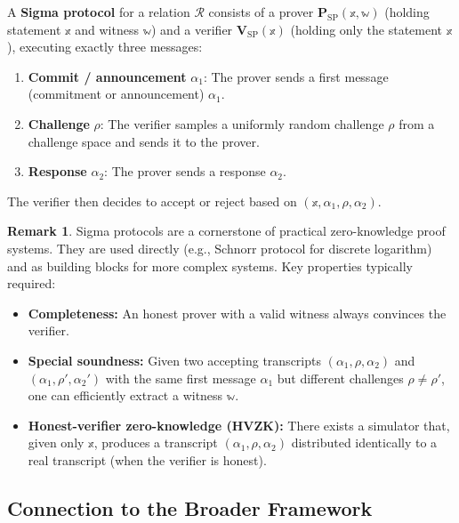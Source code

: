 \documentclass[11pt]{article}
\theoremstyle{plain}
\theoremstyle{definition}
\newtheorem{remark}[theorem]{Remark}
\begin{document}
\begin{definitionbox}
  A \textbf{Sigma protocol} for a relation $\mathcal{R}$ consists of a prover
  $\mathbf{P}_{\mathrm{SP}}(\mathbb{x}, \mathbb{w})$ (holding statement $\mathbb{x}$ and
  witness $\mathbb{w}$) and a verifier $\mathbf{V}_{\mathrm{SP}}(\mathbb{x})$
  (holding only the statement $\mathbb{x}$), executing exactly three messages:
  \begin{enumerate}
    \item \textbf{Commit / announcement} $\alpha_1$: The prover sends a first message
      (commitment or announcement) $\alpha_1$.
    \item \textbf{Challenge} $\rho$: The verifier samples a uniformly random challenge
      $\rho$ from a challenge space and sends it to the prover.
    \item \textbf{Response} $\alpha_2$: The prover sends a response $\alpha_2$.
  \end{enumerate}
  The verifier then decides to accept or reject based on $(\mathbb{x}, \alpha_1, \rho,
  \alpha_2)$.
\end{definitionbox}

\begin{remark}
  Sigma protocols are a cornerstone of practical zero-knowledge proof systems.  They are
  used directly (e.g., Schnorr protocol for discrete logarithm) and as building blocks for
  more complex systems.  Key properties typically required:
  \begin{itemize}
    \item \textbf{Completeness:} An honest prover with a valid witness always convinces
      the verifier.
    \item \textbf{Special soundness:} Given two accepting transcripts
      $(\alpha_1, \rho, \alpha_2)$ and $(\alpha_1, \rho', \alpha_2')$ with the same
      first message $\alpha_1$ but different challenges $\rho \neq \rho'$, one can
      efficiently extract a witness $\mathbb{w}$.
    \item \textbf{Honest-verifier zero-knowledge (HVZK):} There exists a simulator that,
      given only $\mathbb{x}$, produces a transcript $({\alpha_1, \rho, \alpha_2})$
      distributed identically to a real transcript (when the verifier is honest).
  \end{itemize}
\end{remark}

\subsection{Connection to the Broader Framework}
\end{document}
